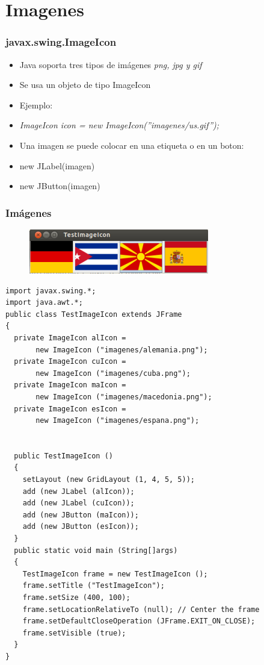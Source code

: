 \documentclass{beamer}
\begin{document}
\section*{Imagenes}
\begin{frame}[fragile]
\frametitle{javax.swing.ImageIcon}
\begin{itemize}[<+->]
\item Java soporta tres tipos de imágenes \emph{png, jpg y gif}
\item Se usa un objeto de tipo \alert{ImageIcon}
\item Ejemplo:
\item \emph{ImageIcon icon = new ImageIcon(''imagenes/us.gif'');}
\item Una imagen se puede colocar en una etiqueta o en un boton:
\item \alert{new JLabel(imagen)}
\item \alert{new JButton(imagen)}
\end{itemize}
\end{frame}

\begin{frame}[fragile]
\frametitle{Imágenes}
\begin{multicols}{2}
\begin{figure}
\includegraphics[scale=0.5]{imagenes/imagen.png}
\end{figure}
\begin{tiny}
\begin{verbatim}
import javax.swing.*;
import java.awt.*;
public class TestImageIcon extends JFrame
{
  private ImageIcon alIcon =
       new ImageIcon ("imagenes/alemania.png");
  private ImageIcon cuIcon = 
       new ImageIcon ("imagenes/cuba.png");
  private ImageIcon maIcon = 
       new ImageIcon ("imagenes/macedonia.png");
  private ImageIcon esIcon = 
       new ImageIcon ("imagenes/espana.png");
  
  
  public TestImageIcon ()
  {
    setLayout (new GridLayout (1, 4, 5, 5));
    add (new JLabel (alIcon));
    add (new JLabel (cuIcon));
    add (new JButton (maIcon));
    add (new JButton (esIcon));
  }
  public static void main (String[]args)
  {
    TestImageIcon frame = new TestImageIcon ();
    frame.setTitle ("TestImageIcon");
    frame.setSize (400, 100);
    frame.setLocationRelativeTo (null); // Center the frame
    frame.setDefaultCloseOperation (JFrame.EXIT_ON_CLOSE);
    frame.setVisible (true);
  }
}
\end{verbatim}
\end{tiny}
\end{multicols}
\end{frame}
\end{document}
